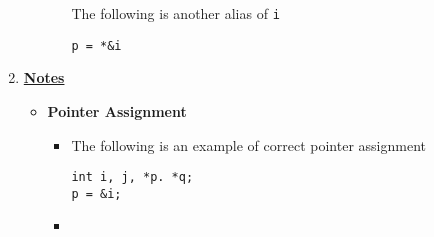 \documentclass[12pt]{article}
\begin{document}
\begin{enumerate}[1.]
\begin{itemize}
\begin{itemize}
            The following is another alias of \texttt{i}

            \bigskip

            \texttt{p = *\&i}
        \end{itemize}
    \end{itemize}

    \item

    \bigskip

    \underline{\textbf{Notes}}

    \begin{itemize}
        \item \textbf{Pointer Assignment}

        \begin{itemize}
            \item The following is an example of correct pointer assignment

            \bigskip

            \texttt{int i, j, *p. *q;\\
            p = \&i;
            }

            \bigskip

            \item
        \end{itemize}
    \end{itemize}
\end{enumerate}
\end{document}
